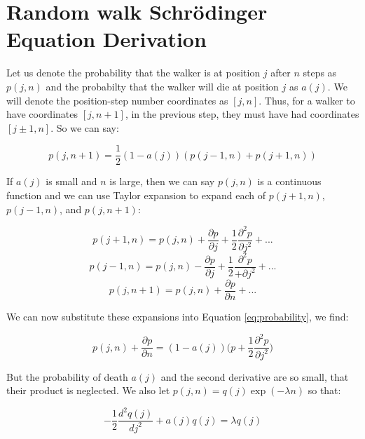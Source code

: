 \documentclass[journal]{IEEEtran}
\begin{document}
\appendices
\section{Random walk Schr\"{o}dinger Equation Derivation}
\label{appendix:derivation}
Let us denote the probability that the walker is at position $j$ after $n$ steps
as $p(j,n)$ and the probabilty that the walker will die at position $j$ as
$a(j)$. We will denote the position-step number coordinates as $[j, n]$. Thus,
for a walker to have coordinates $[j, n+1]$, in the previous step, they must have
had coordinates $[j \pm 1, n]$. So we can say:

\begin{equation}
  \label{eq:probability}
  p(j, n+1) =  \frac{1}{2}(1-a(j))(p(j-1,n) + p(j+1,n))
\end{equation}

If $a(j)$ is small and $n$ is large, then we can say $p(j, n)$ is a continuous
function and we can use Taylor expansion to expand each of $p(j+1, n)$,
$p(j-1,n)$, and $p(j, n+1)$:

\begin{equation}
  p(j+1, n) = p(j,n) + \frac{\partial p}{\partial j} + \frac{1}{2}
  \frac{\partial^2 p}{\partial j^2} + ...
  \nonumber
\end{equation}
\begin{equation}
  p(j-1, n) = p(j,n) - \frac{\partial p}{\partial j} + \frac{1}{2}
  \frac{\partial^2 p}{+\partial j^2} + ...
  \nonumber
\end{equation}
\begin{equation}
  p(j, n+1) = p(j, n) + \frac{\partial p}{\partial n} + ...
  \nonumber
\end{equation}

We can now substitute these expansions into Equation \ref{eq:probability}, we
find:

\begin{equation}
  p(j, n) + \frac{\partial p}{\partial n} = (1-a(j))\Big(p +
  \frac{1}{2}\frac{\partial^2 p}{\partial j^2}\Big)
  \nonumber
\end{equation}

But the probability of death $a(j)$ and the second derivative are so small, that
their product is neglected. We also let $p(j,n) = q(j) \exp(-\lambda n)$ so that:

\begin{equation}
  -\frac{1}{2} \frac{d^2q(j)}{dj^2} + a(j)q(j) = \lambda q(j)
  \nonumber
\end{equation}

\printbibliography
\end{document}
